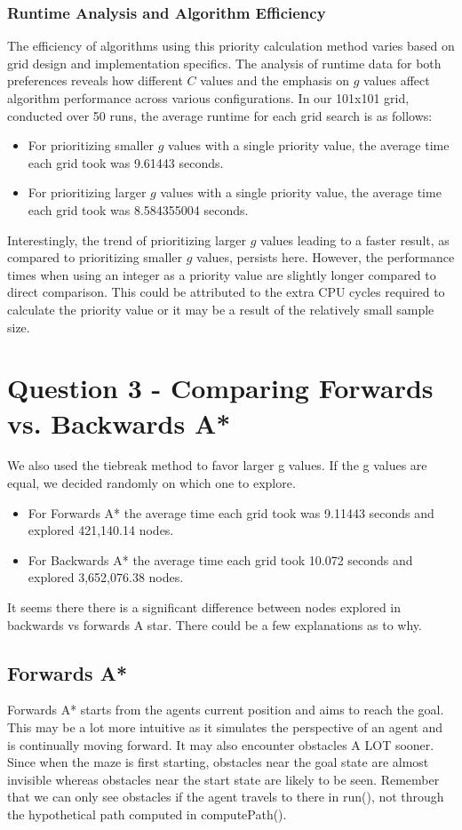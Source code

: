 \documentclass{article}
\begin{document}
\subsubsection{Runtime Analysis and Algorithm Efficiency}
The efficiency of algorithms using this priority calculation method varies based on grid design and implementation specifics. The analysis of runtime data for both preferences reveals how different \(C\) values and the emphasis on \(g\) values affect algorithm performance across various configurations. In our 101x101 grid, conducted over 50 runs, the average runtime for each grid search is as follows:
\begin{itemize}
    \item For prioritizing smaller \(g\) values with a single priority value, the average time each grid took was 9.61443 seconds.
    \item For prioritizing larger \(g\) values with a single priority value, the average time each grid took was 8.584355004 seconds.
\end{itemize}
Interestingly, the trend of prioritizing larger \(g\) values leading to a faster result, as compared to prioritizing smaller \(g\) values, persists here. However, the performance times when using an integer as a priority value are slightly longer compared to direct comparison. This could be attributed to the extra CPU cycles required to calculate the priority value or it may be a result of the relatively small sample size. 




\section{Question 3 - Comparing Forwards vs. Backwards A*}
We also used the tiebreak method to favor larger g values. If the g values are equal, we decided randomly on which one to explore. 

\begin{itemize}
    \item For Forwards A* the average time each grid took was 9.11443 seconds and explored 421,140.14 nodes.
    \item For Backwards A* the average time each grid took 10.072 seconds and explored 3,652,076.38 nodes. 
\end{itemize}

It seems there there is a significant difference between nodes explored in backwards vs forwards A star. There could be a few explanations as to why. 
\subsection{Forwards A*}
Forwards A* starts from the agents current position and aims to reach the goal. This may be a lot more intuitive as it simulates the perspective of an agent and is continually moving forward. It may also encounter obstacles A LOT sooner. Since when the maze is first starting, obstacles near the goal state are almost invisible whereas obstacles near the start state are likely to be seen. Remember that we can only see obstacles if the agent travels to there in run(), not through the hypothetical path computed in computePath(). 
\end{document}
